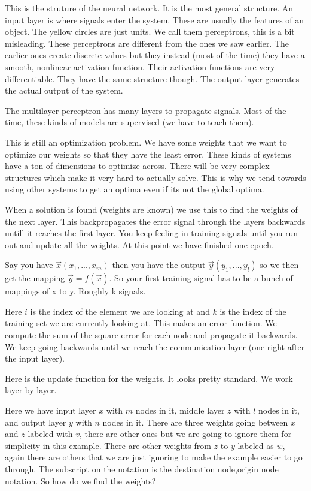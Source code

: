 \documentclass{article}
\begin{document}

This is the struture of the neural network. It is the most general structure. An input layer is where signals enter the system. These are usually the features of an object. The yellow circles are just units. We call them perceptrons, this is a bit misleading. These perceptrons are different from the ones we saw earlier. The earlier ones create discrete values but they instead (most of the time) they have a smooth, nonlinear activation function. Their activation functions are very differentiable. They have the same structure though. The output layer generates the actual output of the system.


The multilayer perceptron has many layers to propagate signals. Most of the time, these kinds of models are supervised (we have to teach them).

This is still an optimization problem. We have some weights that we want to optimize our weights so that they have the least error. These kinds of systems have a ton of dimensions to optimize across. There will be very complex structures which make it very hard to actually solve. This is why we tend towards using other systems to get an optima even if its not the global optima.

When a solution is found (weights are known) we use this to find the weights of the next layer. This backpropagates the error signal through the layers backwards untill it reaches the first layer. You keep feeling in training signals until you run out and update all the weights. At this point we have finished one epoch.

Say you have $\overrightarrow{x}(x_1, ..., x_m)$ then you have the output $\overrightarrow{y}(y_1, ..., y_l)$ so we then get the mapping $\overrightarrow{y} = f(\overrightarrow{x})$. So your first training signal has to be a bunch of mappings of x to y. Roughly k signals.


Here $i$ is the index of the element we are looking at and $k$ is the index of the training set we are currently looking at. This makes an error function. We compute the sum of the square error for each node and propagate it backwards. We keep going backwards until we reach the communication layer (one right after the input layer).


Here is the update function for the weights. It looks pretty standard. We work layer by layer.


Here we have input layer $x$ with $m$ nodes in it, middle layer $z$ with $l$ nodes in it, and output layer $y$ with $n$ nodes in it. There are three weights going between $x$ and $z$ labeled with $v$, there are other ones but we are going to ignore them for simplicity in this example. There are other weights from $z$ to $y$ labeled as $w$, again there are others that we are just ignoring to make the example easier to go through. The subscript on the notation is the destination node,origin node notation. So how do we find the weights?
\end{document}
